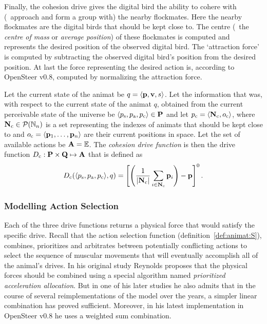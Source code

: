 Finally, the cohesion drive gives the digital bird the ability to cohere with (\ie\ approach and form a group with) the nearby flockmates. Here the nearby flockmates are the digital birds that should be kept close to. The centre (\ie\ the \emph{centre of mass} or \emph{average position}) of these flockmates is computed and represents the desired position of the observed digital bird. The `attraction force' is computed by subtracting the observed digital bird's position from the desired position. At last the force representing the desired action is, according to OpenSteer v0.8, computed by normalizing the attraction force.

\begin{defn}
\label{def:animat:Dc:cwr}
Let the current state of the animat be $q=\langle{\ensuremath{\mathbf{p}}},{\mathbf{v}},s\rangle$. Let the information that was, with respect to the current state of the animat $q$, obtained from the current perceivable state of the universe be $\langle p_\mathrm{s},p_\mathrm{a},p_\mathrm{c}\rangle \in {\ensuremath{\mathbf{P}}}$ and let $p_\mathrm{c}=\langle{\ensuremath{\mathbf{N}}}_\mathrm{c},o_\mathrm{c}\rangle$, where ${\mathbf{N}}_\mathrm{c} \in {\ensuremath{\mathcal{P}(\mathbb{N}_n)}}$ is a set representing the indexes of animats that should be kept close to and $o_\mathrm{c}=\langle{\ensuremath{\mathbf{p}}}_1,\ldots,{\mathbf{p}}_n\rangle$ are their current positions in space. Let the set of available actions be ${\mathbf{A}}=\mathbb{E}$. The \emph{cohesion drive function} is then the drive function $D_\mathrm{c}: {\mathbf{P}} \times {\ensuremath{\mathbf{Q}}} \mapsto {\ensuremath{\mathbf{A}}}$ that is defined as 
\begin{equation}
D_\mathrm{c}(\langle p_\mathrm{s},p_\mathrm{a},p_\mathrm{c}\rangle, q) = \left[ \left( \frac{1}{\left|{\mathbf{N}}_\mathrm{c}\right|} \sum_{i \in {\ensuremath{\mathbf{N}}}_\mathrm{c}} {\mathbf{p}}_i \right) - {\mathbf{p}} \right]^0. \label{eq:animat:Dc:cwr}
\end{equation}
\end{defn}

\subsubsection{Modelling Action Selection}
Each of the three drive functions returns a physical force that would satisfy the specific drive. Recall that the action selection function (definition~\ref{def:animat:S}), combines, prioritizes and arbitrates between potentially conflicting actions to select the sequence of muscular mo\-ve\-ments that will eventually accomplish all of the animal's drives. In his original study Reynolds \cite{reynolds:1987} proposes that the physical forces should be combined using a special algorithm named \emph{prioritized acceleration allocation}. But in one of his later studies \cite{reynolds:1999} he also admits that in the course of several reimplementations of the model over the years, a simpler linear combination has proved sufficient. Moreover, in his latest implementation in OpenSteer v0.8 he uses a weighted sum combination. 

